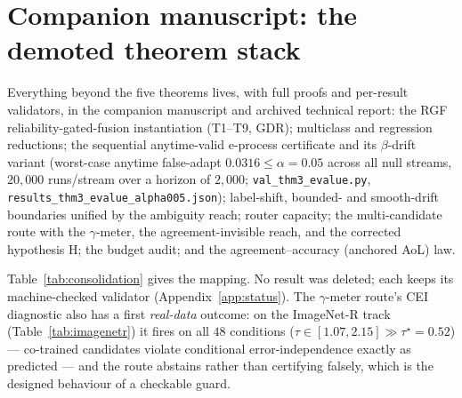 \documentclass[conference]{IEEEtran}
\theoremstyle{plain}
\theoremstyle{definition}
\begin{document}
\appendix
\section{Companion manuscript: the demoted theorem stack}\label{app:stack}\label{app:theory-ext}\label{app:anytime}
Everything beyond the five theorems lives, with full proofs and per-result validators, in
the companion manuscript and archived technical report: the RGF reliability-gated-fusion
instantiation (T1--T9, GDR); multiclass and regression reductions; the sequential
anytime-valid e-process certificate and its $\beta$-drift variant (worst-case anytime
false-adapt $0.0316\le\alpha{=}0.05$ across all null streams, $20{,}000$ runs/stream over a
horizon of $2{,}000$; \texttt{val\_thm3\_evalue.py},
\texttt{results\_thm3\_evalue\_alpha005.json}); label-shift, bounded-
and smooth-drift boundaries unified by the ambiguity reach; router capacity; the
multi-candidate route with the $\gamma$-meter, the agreement-invisible reach, and the
corrected hypothesis H; the budget audit; and the agreement--accuracy (anchored AoL) law.
\begin{table}[t]\centering\small
{}
\caption{The five-theorem consolidation. Fifty-plus prior numbered results survive as
corollaries or manuscript sections; none was deleted, and every one keeps its
machine-checked validator.}
\label{tab:consolidation}
\end{table}
Table~\ref{tab:consolidation} gives the mapping. No result was deleted; each keeps its
machine-checked validator (Appendix~\ref{app:status}). The $\gamma$-meter route's CEI
diagnostic also has a first \emph{real-data} outcome: on the ImageNet-R track
(Table~\ref{tab:imagenetr}) it fires on all $48$ conditions
($\tau\in[1.07,2.15]\gg\tau^\star{=}0.52$) --- co-trained candidates violate conditional
error-independence exactly as predicted --- and the route abstains rather than
certifying falsely, which is the designed behaviour of a checkable guard.
\end{document}
